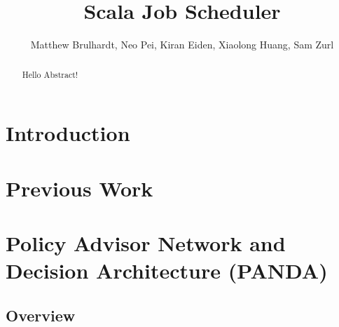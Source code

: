 \documentclass{article}
\title{Scala Job Scheduler}
\author{Matthew Brulhardt, Neo Pei, Kiran Eiden, Xiaolong Huang, Sam Zurl}
\begin{document}
	\maketitle

	\begin{abstract}
		Hello Abstract!
	\end{abstract}

	\section{Introduction}

	\section{Previous Work}


	\section{Policy Advisor Network and Decision Architecture (PANDA)}


	\subsection{Overview}


\end{document}

